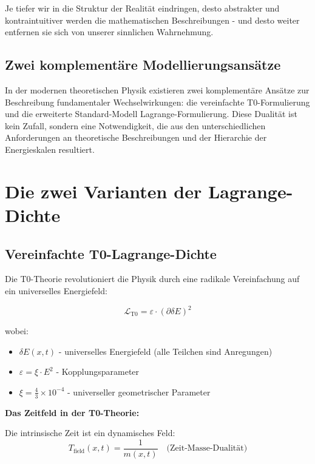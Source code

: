 	Je tiefer wir in die Struktur der Realität eindringen, desto abstrakter und kontraintuitiver werden die mathematischen Beschreibungen - und desto weiter entfernen sie sich von unserer sinnlichen Wahrnehmung.
	
	\subsection{Zwei komplementäre Modellierungsansätze}
	
	In der modernen theoretischen Physik existieren zwei komplementäre Ansätze zur Beschreibung fundamentaler Wechselwirkungen: die vereinfachte T0-Formulierung und die erweiterte Standard-Modell Lagrange-Formulierung. Diese Dualität ist kein Zufall, sondern eine Notwendigkeit, die aus den unterschiedlichen Anforderungen an theoretische Beschreibungen und der Hierarchie der Energieskalen resultiert.
	
	\section{Die zwei Varianten der Lagrange-Dichte}
	
	\subsection{Vereinfachte T0-Lagrange-Dichte}
	
	Die T0-Theorie revolutioniert die Physik durch eine radikale Vereinfachung auf ein universelles Energiefeld:
	
	\begin{t0box}
		\begin{equation}
			\mathcal{L}_{\text{T0}} = \varepsilon \cdot (\partial\delta E)^2
		\end{equation}
		
		wobei:
		\begin{itemize}
			\item $\delta E(x,t)$ - universelles Energiefeld (alle Teilchen sind Anregungen)
			\item $\varepsilon = \xi \cdot E^2$ - Kopplungsparameter
			\item $\xi = \frac{4}{3} \times 10^{-4}$ - universeller geometrischer Parameter
		\end{itemize}
	\end{t0box}
	
	\textbf{Das Zeitfeld in der T0-Theorie:}
	
	Die intrinsische Zeit ist ein dynamisches Feld:
	\begin{equation}
		T_{\text{field}}(x,t) = \frac{1}{m(x,t)} \quad \text{(Zeit-Masse-Dualität)}
	\end{equation}
	
